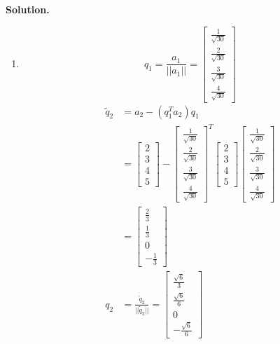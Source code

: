 \documentclass[english,onecolumn]{IEEEtran}
\begin{document}
\noindent
\textbf{Solution.}
\begin{enumerate}
	\item $$q_1=\frac{a_1}{||a_1||}=
    \begin{bmatrix}
    \frac{1}{\sqrt{30}} \\
    \frac{2}{\sqrt{30}} \\
    \frac{3}{\sqrt{30}}\\
    \frac{4}{\sqrt{30}}
    \end{bmatrix}$$
    \begin{align*}
    	\tilde{q}_2&=a_2-(q_1^Ta_2)q_1\\
    	&=
    \begin{bmatrix}
    2\\
    3\\
    4\\
    5
    \end{bmatrix}-    \begin{bmatrix}
    \frac{1}{\sqrt{30}} \\
    \frac{2}{\sqrt{30}} \\
    \frac{3}{\sqrt{30}}\\
    \frac{4}{\sqrt{30}}
    \end{bmatrix}^T    \begin{bmatrix}
    2\\
    3\\
    4\\
    5
    \end{bmatrix}\begin{bmatrix}
    \frac{1}{\sqrt{30}} \\
    \frac{2}{\sqrt{30}} \\
    \frac{3}{\sqrt{30}}\\
    \frac{4}{\sqrt{30}}
    \end{bmatrix}\\
   	&=\begin{bmatrix}
    \frac{2}{3} \\
    \frac{1}{3} \\
    0\\
    -\frac{1}{3}
    \end{bmatrix}\\
    q_2 &= \frac{\tilde{q}_2}{||\tilde{q}_2||}=\begin{bmatrix}
    \frac{\sqrt{6}}{3} \\
    \frac{\sqrt{6}}{6} \\
    0\\
    -\frac{\sqrt{6}}{6}
    \end{bmatrix}

\end{align*}
\end{enumerate}
\end{document}
